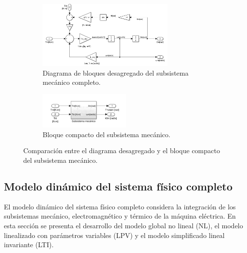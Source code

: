 \documentclass{article}
\begin{document}
\begin{figure}[H]
    \centering
    \begin{subfigure}[t]{\textwidth}
        \centering
        \includegraphics[width=0.75\textwidth]{Imagenes/bloque_subsistema_mecanico.png}
        \caption{Diagrama de bloques desagregado del subsistema mecánico completo.}
        \label{fig:diagrama_bloques_actualizado}
    \end{subfigure}
    
    \vspace{0.5cm} %
    
    \begin{subfigure}[t]{\textwidth}
        \centering
        \includegraphics[width=0.5\textwidth]{Imagenes/bloque_subsistema_mecanico_compacto.png}
        \caption{Bloque compacto del subsistema mecánico.}
        \label{fig:bloque_subsistema_mecanico_compacto}
    \end{subfigure}
    
    \caption{Comparación entre el diagrama desagregado y el bloque compacto del subsistema mecánico.}
    \label{fig:subsistema_mecanico_comparacion}
\end{figure}


\subsection{Modelo dinámico del sistema físico completo}

El modelo dinámico del sistema físico completo considera la integración de los subsistemas mecánico, electromagnético y térmico de la máquina eléctrica. En esta sección se presenta el desarrollo del modelo global no lineal (NL), el modelo linealizado con parámetros variables (LPV) y el modelo simplificado lineal invariante (LTI).
\end{document}
